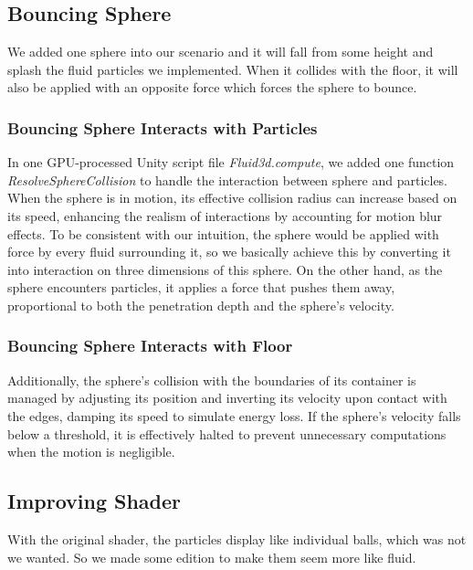 \documentclass{article}
\begin{document}
\subsection{Bouncing Sphere}
 \hspace{1em} We added one sphere into our scenario and it will fall from some height and splash the fluid particles we implemented. When it collides with the floor, it will also be applied with an opposite force which forces the sphere to bounce.

\subsubsection{Bouncing Sphere Interacts with Particles}
 \hspace{1em} In one GPU-processed Unity script file \textit{Fluid3d.compute}, we added one function \textit{ResolveSphereCollision} to handle the interaction between sphere and particles. When the sphere is in motion, its effective collision radius can increase based on its speed, enhancing the realism of interactions by accounting for motion blur effects. To be consistent with our intuition, the sphere would be applied with force by every fluid surrounding it, so we basically achieve this by converting it into interaction on three dimensions of this sphere. On the other hand, as the sphere encounters particles, it applies a force that pushes them away, proportional to both the penetration depth and the sphere's velocity. 




\subsubsection{Bouncing Sphere Interacts with Floor}
 \hspace{1em} Additionally, the sphere's collision with the boundaries of its container is managed by adjusting its position and inverting its velocity upon contact with the edges, damping its speed to simulate energy loss. If the sphere's velocity falls below a threshold, it is effectively halted to prevent unnecessary computations when the motion is negligible.





\subsection{Improving Shader}
\hspace{1em} With the original shader, the particles display like individual balls, which was not we wanted. So we made some edition to make them seem more like fluid.
\end{document}
